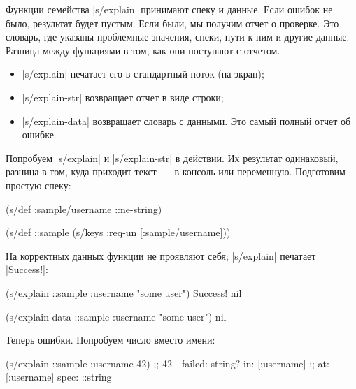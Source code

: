 Функции семейства \spverb|s/explain| принимают спеку и данные. Если ошибок не
было, результат будет пустым. Если были, мы получим отчет о проверке. Это
словарь, где указаны проблемные значения, спеки, пути к ним и другие
данные. Разница между функциями в том, как они поступают с отчетом.

\begin{itemize}

\item
  \spverb|s/explain| печатает его в стандартный поток (на экран);

\item
  \spverb|s/explain-str| возвращает отчет в виде строки;

\item
  \spverb|s/explain-data| возвращает словарь с данными. Это самый полный отчет
  об ошибке.

\end{itemize}

Попробуем \spverb|s/explain| и \spverb|s/explain-str| в действии. Их результат
одинаковый, разница в том, куда приходит текст~--- в консоль или переменную.
Подготовим простую спеку:

\begin{english}
  \begin{clojure}
(s/def :sample/username ::ne-string)

(s/def ::sample
  (s/keys :req-un [:sample/username]))
  \end{clojure}
\end{english}

На корректных данных функции не проявляют себя; \spverb|s/explain| печатает
\spverb|Success!|:

\begin{english}
  \begin{clojure}
(s/explain ::sample {:username "some user"})
Success!
nil

(s/explain-data ::sample {:username "some user"})
nil
  \end{clojure}
\end{english}

Теперь ошибки. Попробуем число вместо имени:

\begin{english}
  \begin{clojure}
(s/explain ::sample {:username 42})
;; 42 - failed: string? in: [:username]
;; at: [:username] spec: ::string
  \end{clojure}
\end{english}

